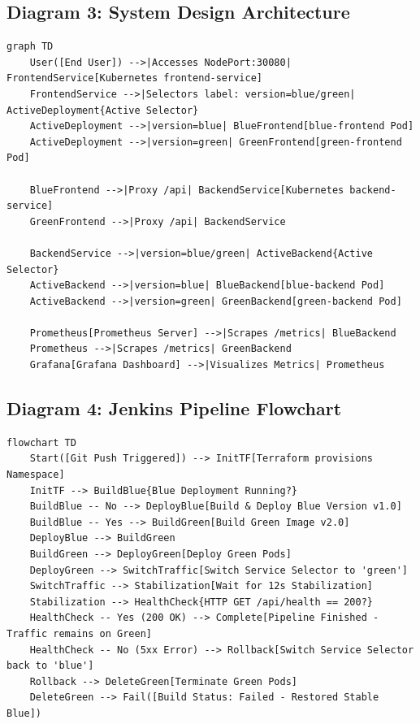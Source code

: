 \documentclass[12pt,a4paper]{article}
\begin{document}
\subsection*{Diagram 3: System Design Architecture}
\begin{lstlisting}
graph TD
    User([End User]) -->|Accesses NodePort:30080| FrontendService[Kubernetes frontend-service]
    FrontendService -->|Selectors label: version=blue/green| ActiveDeployment{Active Selector}
    ActiveDeployment -->|version=blue| BlueFrontend[blue-frontend Pod]
    ActiveDeployment -->|version=green| GreenFrontend[green-frontend Pod]
    
    BlueFrontend -->|Proxy /api| BackendService[Kubernetes backend-service]
    GreenFrontend -->|Proxy /api| BackendService
    
    BackendService -->|version=blue/green| ActiveBackend{Active Selector}
    ActiveBackend -->|version=blue| BlueBackend[blue-backend Pod]
    ActiveBackend -->|version=green| GreenBackend[green-backend Pod]

    Prometheus[Prometheus Server] -->|Scrapes /metrics| BlueBackend
    Prometheus -->|Scrapes /metrics| GreenBackend
    Grafana[Grafana Dashboard] -->|Visualizes Metrics| Prometheus
\end{lstlisting}

\subsection*{Diagram 4: Jenkins Pipeline Flowchart}
\begin{lstlisting}
flowchart TD
    Start([Git Push Triggered]) --> InitTF[Terraform provisions Namespace]
    InitTF --> BuildBlue{Blue Deployment Running?}
    BuildBlue -- No --> DeployBlue[Build & Deploy Blue Version v1.0]
    BuildBlue -- Yes --> BuildGreen[Build Green Image v2.0]
    DeployBlue --> BuildGreen
    BuildGreen --> DeployGreen[Deploy Green Pods]
    DeployGreen --> SwitchTraffic[Switch Service Selector to 'green']
    SwitchTraffic --> Stabilization[Wait for 12s Stabilization]
    Stabilization --> HealthCheck{HTTP GET /api/health == 200?}
    HealthCheck -- Yes (200 OK) --> Complete[Pipeline Finished - Traffic remains on Green]
    HealthCheck -- No (5xx Error) --> Rollback[Switch Service Selector back to 'blue']
    Rollback --> DeleteGreen[Terminate Green Pods]
    DeleteGreen --> Fail([Build Status: Failed - Restored Stable Blue])
\end{lstlisting}
\end{document}
